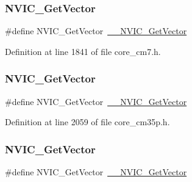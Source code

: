 \subsubsection{\texorpdfstring{N\+V\+I\+C\+\_\+\+Get\+Vector}{NVIC\_GetVector}\hspace{0.1cm}{\footnotesize\ttfamily [10/13]}}
{\footnotesize\ttfamily \#define N\+V\+I\+C\+\_\+\+Get\+Vector~\hyperlink{group___c_m_s_i_s___core___n_v_i_c_functions_ga44b665d2afb708121d9b10c76ff00ee5}{\+\_\+\+\_\+\+N\+V\+I\+C\+\_\+\+Get\+Vector}}



Definition at line 1841 of file core\+\_\+cm7.\+h.

\mbox{\label{group___c_m_s_i_s___core___n_v_i_c_functions_ga955eb1c33a3dcc62af11a8385e8c0fc8}} 
\subsubsection{\texorpdfstring{N\+V\+I\+C\+\_\+\+Get\+Vector}{NVIC\_GetVector}\hspace{0.1cm}{\footnotesize\ttfamily [11/13]}}
{\footnotesize\ttfamily \#define N\+V\+I\+C\+\_\+\+Get\+Vector~\hyperlink{group___c_m_s_i_s___core___n_v_i_c_functions_ga44b665d2afb708121d9b10c76ff00ee5}{\+\_\+\+\_\+\+N\+V\+I\+C\+\_\+\+Get\+Vector}}



Definition at line 2059 of file core\+\_\+cm35p.\+h.

\mbox{\label{group___c_m_s_i_s___core___n_v_i_c_functions_ga955eb1c33a3dcc62af11a8385e8c0fc8}} 
\subsubsection{\texorpdfstring{N\+V\+I\+C\+\_\+\+Get\+Vector}{NVIC\_GetVector}\hspace{0.1cm}{\footnotesize\ttfamily [12/13]}}
{\footnotesize\ttfamily \#define N\+V\+I\+C\+\_\+\+Get\+Vector~\hyperlink{group___c_m_s_i_s___core___n_v_i_c_functions_ga44b665d2afb708121d9b10c76ff00ee5}{\+\_\+\+\_\+\+N\+V\+I\+C\+\_\+\+Get\+Vector}}



